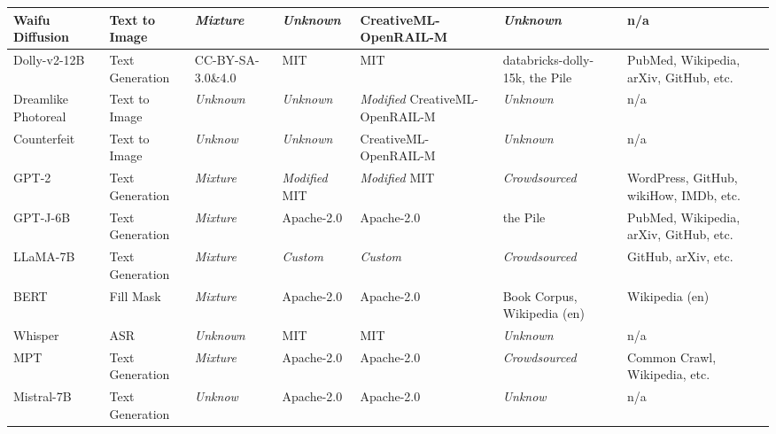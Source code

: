 \begin{table}[t]
\begin{tabular}{|p{2.1cm}|p{1.6cm}|p{2cm}|p{2.75cm}|p{3cm}|p{1.7cm}|p{2cm}|}
      Waifu Diffusion & Text to Image & \textit{Mixture} & \textit{Unknown} & CreativeML-OpenRAIL-M & \textit{Unknown} & n/a \\ \hline

      Dolly-v2-12B & Text Generation & CC-BY-SA-3.0\&4.0 & MIT & MIT & databricks-dolly\newline-15k, the Pile & PubMed,  Wikipedia, \newline arXiv, GitHub, etc. \\ \hline

      Dreamlike Photoreal & Text to Image & \textit{Unknown} & \textit{Unknown} & \textit{Modified} CreativeML-\newline OpenRAIL-M & \textit{Unknown} & n/a \\ \hline

      Counterfeit & Text to Image & \textit{Unknow} & \textit{Unknown} & CreativeML-OpenRAIL-M & \textit{Unknown} & n/a \\ \hline

      GPT-2 & Text Generation & \textit{Mixture} & \textit{Modified} MIT & \textit{Modified} MIT & \textit{Crowdsourced} & WordPress, GitHub, \newline wikiHow, IMDb, etc. \\ \hline

      GPT-J-6B & Text Generation & \textit{Mixture} & Apache-2.0 & Apache-2.0 & the Pile & PubMed,  Wikipedia, \newline arXiv, GitHub, etc. \\ \hline

      LLaMA-7B & Text Generation & \textit{Mixture} & \textit{Custom} & \textit{Custom} & \textit{Crowdsourced} & GitHub, arXiv, etc. \\ \hline

      BERT & Fill Mask & \textit{Mixture} & Apache-2.0 & Apache-2.0 & Book Corpus, \newline Wikipedia (en) & Wikipedia (en) \\ \hline

      Whisper & ASR & \textit{Unknown} & MIT & MIT & \textit{Unknown} & n/a \\ \hline

      MPT & Text Generation & \textit{Mixture} & Apache-2.0 & Apache-2.0 & \textit{Crowdsourced} & Common Crawl, \newline Wikipedia, etc. \\ \hline

      Mistral-7B & Text Generation & \textit{Unknow} & Apache-2.0 & Apache-2.0 & \textit{Unknow} & n/a \\ \hline
  

  \end{tabular}
\end{table}


